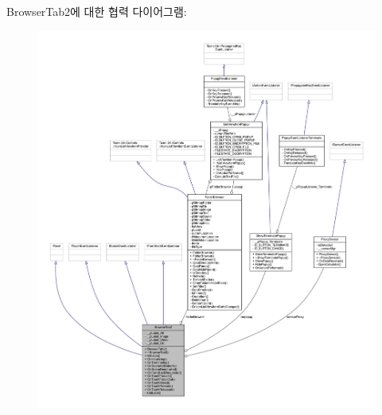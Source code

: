 Browser\+Tab2에 대한 협력 다이어그램\+:
\nopagebreak
\begin{figure}[H]
\begin{center}
\leavevmode
\includegraphics[width=350pt]{class_browser_tab2__coll__graph}
\end{center}
\end{figure}
